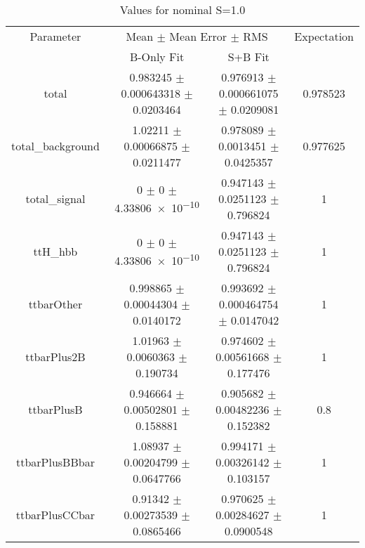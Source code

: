 \begin{table}
\centering
\caption{Values for nominal S=1.0}
\begin{tabular}{cccc}
\toprule
Parameter & \multicolumn{2}{c}{Mean $\pm$ Mean Error $\pm$ RMS} & Expectation\\
 & B-Only Fit & S+B Fit & \\
\midrule
total & \num{0.983245} $\pm$ \num{0.000643318} $\pm$ \num{0.0203464} & \num{0.976913} $\pm$ \num{0.000661075} $\pm$ \num{0.0209081} & \num{0.978523}\\
total\_background & \num{1.02211} $\pm$ \num{0.00066875} $\pm$ \num{0.0211477} & \num{0.978089} $\pm$ \num{0.0013451} $\pm$ \num{0.0425357} & \num{0.977625}\\
total\_signal & \num{0} $\pm$ \num{0} $\pm$ \num{4.33806e-10} & \num{0.947143} $\pm$ \num{0.0251123} $\pm$ \num{0.796824} & \num{1}\\
ttH\_hbb & \num{0} $\pm$ \num{0} $\pm$ \num{4.33806e-10} & \num{0.947143} $\pm$ \num{0.0251123} $\pm$ \num{0.796824} & \num{1}\\
ttbarOther & \num{0.998865} $\pm$ \num{0.00044304} $\pm$ \num{0.0140172} & \num{0.993692} $\pm$ \num{0.000464754} $\pm$ \num{0.0147042} & \num{1}\\
ttbarPlus2B & \num{1.01963} $\pm$ \num{0.0060363} $\pm$ \num{0.190734} & \num{0.974602} $\pm$ \num{0.00561668} $\pm$ \num{0.177476} & \num{1}\\
ttbarPlusB & \num{0.946664} $\pm$ \num{0.00502801} $\pm$ \num{0.158881} & \num{0.905682} $\pm$ \num{0.00482236} $\pm$ \num{0.152382} & \num{0.8}\\
ttbarPlusBBbar & \num{1.08937} $\pm$ \num{0.00204799} $\pm$ \num{0.0647766} & \num{0.994171} $\pm$ \num{0.00326142} $\pm$ \num{0.103157} & \num{1}\\
ttbarPlusCCbar & \num{0.91342} $\pm$ \num{0.00273539} $\pm$ \num{0.0865466} & \num{0.970625} $\pm$ \num{0.00284627} $\pm$ \num{0.0900548} & \num{1}\\
\bottomrule
\end{tabular}
\end{table}